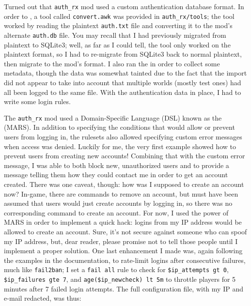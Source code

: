 \documentclass{article}
\begin{document}
Turned out that \texttt{auth_rx} mod used a custom authentication database format.  In order to , a tool called \texttt{convert.awk} was provided in \texttt{auth_rx/tools}; the tool worked by reading the plaintext \texttt{auth.txt} file and converting it to the mod's alternate \texttt{auth.db} file.  You may recall that I had previously migrated from plaintext to SQLite3; well, as far as I could tell, the tool only worked on the plaintext format, so I had to re-migrate from SQLite3 back to normal plaintext, then migrate to the mod's format.  I also ran the  in order to collect some metadata, though the data was somewhat tainted due to the fact that the import did not appear to take into account that multiple worlds (mostly test ones) had all been logged to the same file.  With the authentication data in place, I had to write some login rules.

The \texttt{auth_rx} mod used a Domain-Specific Language (DSL) known as the  (MARS).  In addition to specifying the conditions that would allow or prevent users from logging in, the rulesets also allowed specifying custom error messages when access was denied.  Luckily for me, the very first example showed how to prevent users from creating new accounts!  Combining that with the custom error message, I was able to both block new, unauthorized users and to provide a message telling them how they could contact me in order to get an account created.  There was one caveat, though: how was I supposed to create an account now?  In-game, there are commands to remove an account, but must have been assumed that users would just create accounts by logging in, so there was no corresponding command to create an account.  For now, I used the power of MARS in order to implement a quick hack: logins from my IP address would be allowed to create an account.  Sure, it's not secure against someone who can spoof my IP address, but, dear reader, please promise not to tell those people until I implement a proper solution.  One last enhancement I made was, again following the examples in the documentation, to rate-limit logins after consecutive failures, much like \texttt{fail2ban};  I set a \texttt{fail all} rule to check for \texttt{\$ip_attempts gt 0}, \texttt{\$ip_failures gte 7}, and \texttt{age(\$ip_newcheck) lt 5m} to throttle players for 5 minutes after 7 failed login attempts.  The full configuration file, with my IP and e-mail redacted, was thus:
\end{document}
